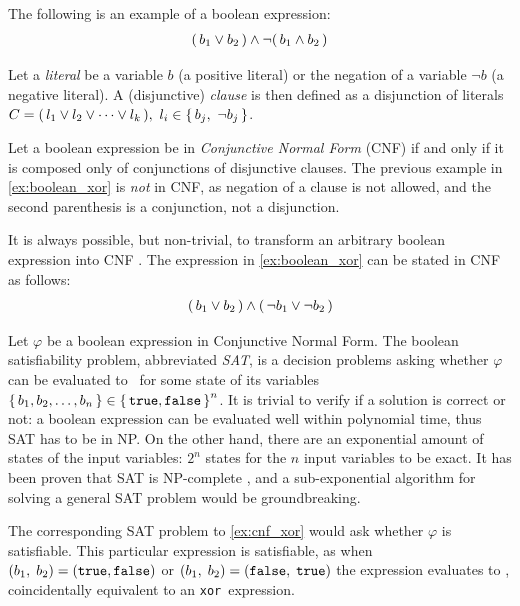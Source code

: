 The following is an example of a boolean expression:
\begin{align}\label{ex:boolean_xor}
	(\, b_1 \lor b_2 \,) \land \neg (\, b_1 \land b_2 \,)
\end{align}

Let a \emph{literal} be a variable \(b\) (a positive literal) or the negation of a variable \(\neg b\) (a negative literal). 
A (disjunctive) \emph{clause} is then defined as a disjunction of literals \(C = (\, l_1 \lor l_2 \lor \dots \lor l_k \,), \ l_i \in \set{b_j,\ \neg b_j}\). 

Let a boolean expression be in \emph{Conjunctive Normal Form} (CNF) if and only if it is composed only of conjunctions of disjunctive clauses. 
The previous example in \cref{ex:boolean_xor} is \emph{not} in CNF, as negation of a clause is not allowed, and the second parenthesis is a conjunction, not a disjunction.

\begin{remark}
	It is always possible, but non-trivial, to transform an arbitrary boolean expression into CNF \cite{aw/RN2020}.
	The expression in \cref{ex:boolean_xor} can be stated in CNF as follows:
	\begin{align}\label{ex:cnf_xor}
		(\, b_1 \lor b_2 \,) \land (\, \neg b_1 \lor \neg b_2 \,)
	\end{align}
\end{remark}

Let \(\varphi\) be a boolean expression in Conjunctive Normal Form. 
The boolean satisfiability problem, abbreviated \emph{SAT}, is a decision problems asking whether \(\varphi\) can be evaluated to \true\ for some state of its variables \(\set{b_1, b_2, \dots, b_n} \in \set{\texttt{true}, \texttt{false}}^{n}\). 
It is trivial to verify if a solution is correct or not: a boolean expression can be evaluated well within polynomial time, thus SAT has to be in NP. 
On the other hand, there are an exponential amount of states of the input variables: \(2^n\) states for the \(n\) input variables to be exact. 
It has been proven that SAT is NP-complete \cite{coco/Karp72}, and a sub-exponential algorithm for solving a general SAT problem would be groundbreaking. 

The corresponding SAT problem to \cref{ex:cnf_xor} would ask whether \(\varphi\) is satisfiable. 
This particular expression is satisfiable, as when \((b_1, \; b_2) = (\texttt{true}, \texttt{false})\) or \((b_1, \; b_2) = (\texttt{false}, \; \texttt{true})\) the expression evaluates to \true, coincidentally equivalent to an \texttt{xor}\ expression.

